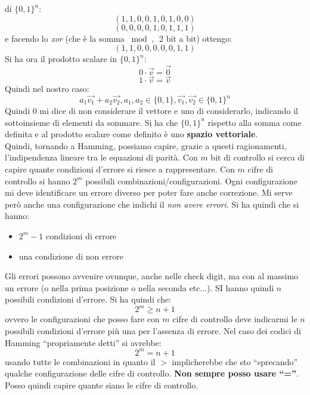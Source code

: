 \documentclass[a4paper,12pt, oneside]{book}
\begin{document}
di $\{0,1\}^n$:
\[(1,1,0,0,1,0,1,0,0)\]
\[(0,0,0,0,1,0,1,1,1)\]
e facendo lo \textit{xor} (che è la somma $\bmod,\,\,\,2$ bit a bit) ottengo:
\[(1,1,0,0,0,0,0,1,1)\]
Si ha ora il prodotto scalare in $\{0,1\}^n$:
\[0\cdot \vec{v}=\vec{0}\]
\[1\cdot \vec{v}=\vec{v}\]
Quindi nel nostro caso:
\[a_1\vec{v_1}+a_2\vec{v_2},a_1,a_2\in \{0,1\}, \vec{v_1},\vec{v_2}\in
  \{0,1\}^n\]
Quindi 0 mi dice di non considerare il vettore e uno di considerarlo, indicando
il sottoinsieme di elementi da sommare.
Si ha che $\{0,1\}^n$ rispetto alla somma come definita e al prodotto scalare
come definito è uno \textbf{spazio vettoriale}.\\
Quindi, tornando a Hamming, possiamo capire, grazie a questi ragionamenti,
l'indipendenza lineare tra le equazioni di parità. Con $m$ bit di controllo si
cerca di capire quante condizioni d'errore si riesce a rappresentare. Con $m$
cifre di controllo si hanno $2^m$ possibili combinazioni/configurazioni. Ogni
configurazione mi deve identificare un errore diverso per poter fare anche
correzione. Mi serve però anche una configurazione che indichi il \textit{non
  avere errori}. Si ha quindi che si hanno:
\begin{itemize}
  \item $2^m-1$ condizioni di errore
  \item una condizione di non errore
\end{itemize}
Gli errori possono avvenire ovunque, anche nelle check digit, ma con al massimo
un errore (o nella prima posizione o nella seconda etc$\ldots$). SI hanno quindi
$n$ possibili condizioni d'errore. Si ha quindi che:
\[2^m\geq n+1\]
ovvero le configurazioni che posso fare con $m$ cifre di controllo deve
indicarmi le $n$ possibili condizioni d'errore più una per l'assenza di errore.
Nel caso dei codici di Hamming ``propriamente detti'' si avrebbe:
\[2^m= n+1\]
usando tutte le combinazioni in quanto il $>$ implicherebbe che sto
``sprecando'' qualche configurazione delle cifre di controllo. \textbf{Non
  sempre posso usare ``=''}.\\
Posso quindi capire quante siano le cifre di controllo.
\end{document}
